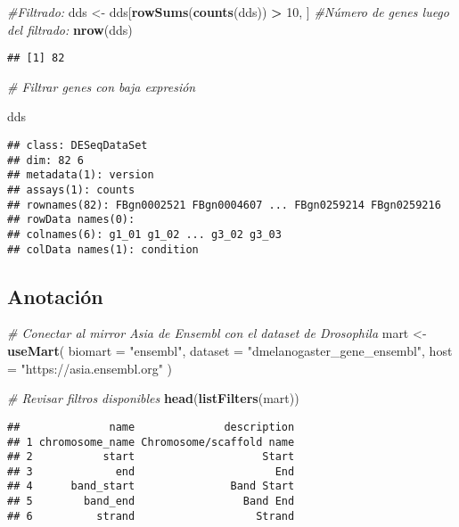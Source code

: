 \documentclass[
]{article}
\newenvironment{Shaded}{\begin{snugshade}}{\end{snugshade}}
\newcommand{\AttributeTok}[1]{\textcolor[rgb]{0.13,0.29,0.53}{#1}}
\newcommand{\CommentTok}[1]{\textcolor[rgb]{0.56,0.35,0.01}{\textit{#1}}}
\newcommand{\DecValTok}[1]{\textcolor[rgb]{0.00,0.00,0.81}{#1}}
\newcommand{\FunctionTok}[1]{\textcolor[rgb]{0.13,0.29,0.53}{\textbf{#1}}}
\newcommand{\NormalTok}[1]{#1}
\newcommand{\OtherTok}[1]{\textcolor[rgb]{0.56,0.35,0.01}{#1}}
\newcommand{\SpecialCharTok}[1]{\textcolor[rgb]{0.81,0.36,0.00}{\textbf{#1}}}
\newcommand{\StringTok}[1]{\textcolor[rgb]{0.31,0.60,0.02}{#1}}
\begin{document}
\begin{Shaded}
\begin{Highlighting}[]
\CommentTok{\#Filtrado:}
\NormalTok{dds }\OtherTok{\textless{}{-}}\NormalTok{ dds[}\FunctionTok{rowSums}\NormalTok{(}\FunctionTok{counts}\NormalTok{(dds)) }\SpecialCharTok{\textgreater{}} \DecValTok{10}\NormalTok{, ]}
\CommentTok{\#Número de genes luego del filtrado:}
\FunctionTok{nrow}\NormalTok{(dds)}
\end{Highlighting}
\end{Shaded}

\begin{verbatim}
## [1] 82
\end{verbatim}

\begin{Shaded}
\begin{Highlighting}[]
\CommentTok{\# Filtrar genes con baja expresión}

\NormalTok{dds}
\end{Highlighting}
\end{Shaded}

\begin{verbatim}
## class: DESeqDataSet 
## dim: 82 6 
## metadata(1): version
## assays(1): counts
## rownames(82): FBgn0002521 FBgn0004607 ... FBgn0259214 FBgn0259216
## rowData names(0):
## colnames(6): g1_01 g1_02 ... g3_02 g3_03
## colData names(1): condition
\end{verbatim}

\subsection{Anotación}\label{anotaciuxf3n}

\begin{Shaded}
\begin{Highlighting}[]
\CommentTok{\# Conectar al mirror Asia de Ensembl con el dataset de Drosophila}
\NormalTok{mart }\OtherTok{\textless{}{-}} \FunctionTok{useMart}\NormalTok{(}
  \AttributeTok{biomart =} \StringTok{"ensembl"}\NormalTok{,}
  \AttributeTok{dataset =} \StringTok{"dmelanogaster\_gene\_ensembl"}\NormalTok{,}
  \AttributeTok{host =} \StringTok{"https://asia.ensembl.org"}
\NormalTok{)}

\CommentTok{\# Revisar filtros disponibles}
\FunctionTok{head}\NormalTok{(}\FunctionTok{listFilters}\NormalTok{(mart))}
\end{Highlighting}
\end{Shaded}

\begin{verbatim}
##              name              description
## 1 chromosome_name Chromosome/scaffold name
## 2           start                    Start
## 3             end                      End
## 4      band_start               Band Start
## 5        band_end                 Band End
## 6          strand                   Strand
\end{verbatim}
\end{document}
